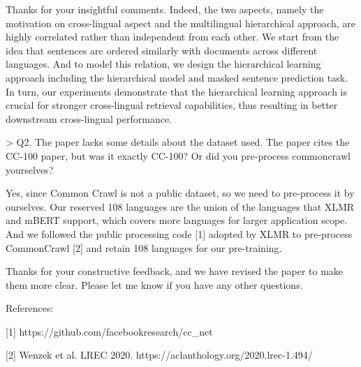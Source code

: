 Thanks for your insightful comments. Indeed, the two aspects, namely the motivation on cross-lingual aspect and the multilingual hierarchical approach, are highly correlated rather than independent from each other. We start from the idea that sentences are ordered similarly with documents across different languages. And to model this relation, we design the hierarchical learning approach including the hierarchical model and masked sentence prediction task. In turn, our experiments demonstrate that the hierarchical learning approach is crucial for stronger cross-lingual retrieval capabilities, thus resulting in better downstream cross-lingual performance. 



> Q2. The paper lacks some details about the dataset used. The paper cites the CC-100 paper, but was it exactly CC-100? Or did you pre-process commoncrawl yourselves?

Yes, since Common Crawl is not a public dataset, so we need to pre-process it  by ourselves. Our reserved 108 languages are the union of the languages that XLMR and mBERT support, which covers more languages for larger application scope. And we followed the public processing code [1] adopted by XLMR to pre-process CommonCrawl [2] and retain 108 languages for our pre-training.



Thanks for your constructive feedback, and we have revised the paper to make them more clear. Please let me know if you have any other questions.

References:

[1] https://github.com/facebookresearch/cc_net

[2] Wenzek et al. LREC 2020. https://aclanthology.org/2020.lrec-1.494/